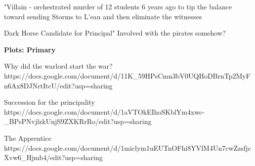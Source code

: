 \documentclass[char]{GL2020}
\begin{document}
\name{\cEvil{}}








"Villain - orchestrated murder of 12 students 6 years ago to tip the balance toward sending Storms to L'eau and then eliminate the witnesses

Dark Horse Candidate for Principal"	Involved with the pirates somehow?

\textbf{Plots: Primary}

Why did the warlord start the war?
https://docs.google.com/document/d/11K_59HPsCmn3bV0UQHoDBrnTp2MyFn6Ax8DJNrtItcU/edit?usp=sharing

Succession for the principality
https://docs.google.com/document/d/1aVTOkEIhoSKblYm4xwc-_BPsPNvjlzkUnjS9ZXKRrRo/edit?usp=sharing

The Apprentice
https://docs.google.com/document/d/1miclym1uEUTnOFhi8YVlM4Un7cwZzsfjcXvw6_Hjmb4/edit?usp=sharing
\end{document}

